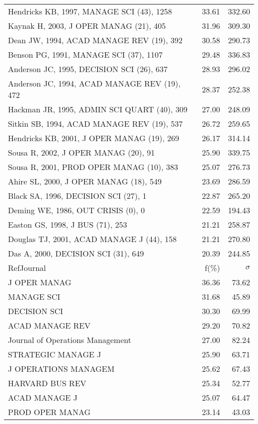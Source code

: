 \documentclass[a4paper,11pt]{report}
\begin{document}
\begin{landscape}
\begin{table}[!ht]
{\begin{tabular}{|l r r|}
Hendricks KB, 1997, MANAGE SCI (43), 1258 & 33.61 & 332.60\\
Kaynak H, 2003, J OPER MANAG (21), 405 & 31.96 & 309.30\\
Dean JW, 1994, ACAD MANAGE REV (19), 392 & 30.58 & 290.73\\
Benson PG, 1991, MANAGE SCI (37), 1107 & 29.48 & 336.83\\
Anderson JC, 1995, DECISION SCI (26), 637 & 28.93 & 296.02\\
Anderson JC, 1994, ACAD MANAGE REV (19), 472 & 28.37 & 252.38\\
Hackman JR, 1995, ADMIN SCI QUART (40), 309 & 27.00 & 248.09\\
Sitkin SB, 1994, ACAD MANAGE REV (19), 537 & 26.72 & 259.65\\
Hendricks KB, 2001, J OPER MANAG (19), 269 & 26.17 & 314.14\\
Sousa R, 2002, J OPER MANAG (20), 91 & 25.90 & 339.75\\
Sousa R, 2001, PROD OPER MANAG (10), 383 & 25.07 & 276.73\\
Ahire SL, 2000, J OPER MANAG (18), 549 & 23.69 & 286.59\\
Black SA, 1996, DECISION SCI (27), 1 & 22.87 & 265.20\\
Deming WE, 1986, OUT CRISIS (0), 0 & 22.59 & 194.43\\
Easton GS, 1998, J BUS (71), 253 & 21.21 & 258.87\\
Douglas TJ, 2001, ACAD MANAGE J (44), 158 & 21.21 & 270.80\\
Das A, 2000, DECISION SCI (31), 649 & 20.39 & 244.85\\
\hline
\hline
RefJournal & f(\%) & $\sigma$\\
\hline
J OPER MANAG & 36.36 & 73.62\\
MANAGE SCI & 31.68 & 45.89\\
DECISION SCI & 30.30 & 69.99\\
ACAD MANAGE REV & 29.20 & 70.82\\
Journal of Operations Management & 27.00 & 82.24\\
STRATEGIC MANAGE J & 25.90 & 63.71\\
J OPERATIONS MANAGEM & 25.62 & 67.43\\
HARVARD BUS REV & 25.34 & 52.77\\
ACAD MANAGE J & 25.07 & 64.47\\
PROD OPER MANAG & 23.14 & 43.03\\
\hline
\end{tabular}
}
\end{table}


\end{landscape}
\end{document}
